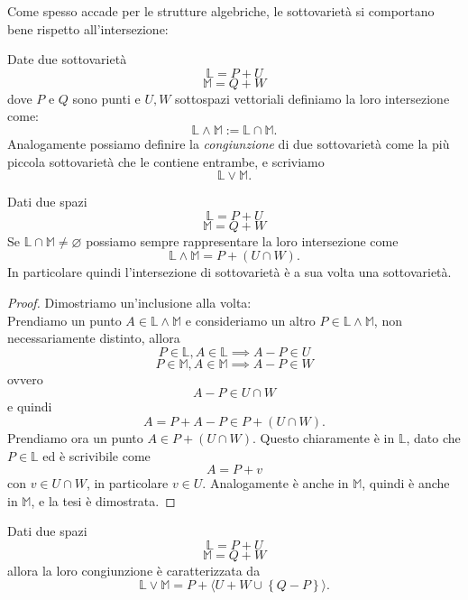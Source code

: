 \documentclass[11pt]{scrartcl}
\newcommand{\eset}{\varnothing}
\begin{document}
   	 Come spesso accade per le strutture algebriche, le sottovarietà si comportano bene rispetto all'intersezione:
   	 \begin{definition}
   	 	Date due sottovarietà 
   	 	$$\mathbb{L}=P+U$$
   	 	$$\mathbb{M}=Q+W$$
   	 	dove $P$ e $Q$ sono punti e $U,W$ sottospazi vettoriali definiamo la loro intersezione come:
   	 	$$\mathbb{L}\land \mathbb{M}:=\mathbb{L}\cap \mathbb{M}.$$
   	 	Analogamente possiamo definire la \textit{congiunzione} di due sottovarietà come la più piccola sottovarietà che le contiene entrambe, e scriviamo
   	 	$$\mathbb{L}\lor \mathbb{M}.$$
   	 \end{definition}
   	 \begin{proposition}
   	 	Dati due spazi
   	 	$$\mathbb{L}=P+U$$
   	 	$$\mathbb{M}=Q+W$$
   	 	Se $\mathbb{L}\cap \mathbb{M}\ne \eset$ possiamo sempre rappresentare la loro intersezione come
   	 	$$\mathbb{L}\land \mathbb{M}=P+(U\cap W).$$
   	 	In particolare quindi l'intersezione di sottovarietà è a sua volta una sottovarietà.
   	 \end{proposition}
   	 \begin{proof}
   	 	Dimostriamo un'inclusione alla volta: \\
   	 	Prendiamo un punto $A\in \mathbb{L}\land \mathbb{M}$ e consideriamo un altro $P\in \mathbb{L}\land \mathbb{M}$, non necessariamente distinto, allora
   	 	$$P\in \mathbb{L}, A\in \mathbb{L} \implies A-P \in U$$
   	 	$$P\in \mathbb{M}, A\in \mathbb{M} \implies A-P \in W$$
   	 	ovvero 
   	 	$$A-P\in U\cap W$$
   	 	e quindi
   	 	$$A=P+A-P\in P+(U\cap W).$$
   	 	Prendiamo ora un punto $A\in P+(U\cap W)$. Questo chiaramente è in $\mathbb{L}$, dato che $P\in \mathbb{L}$ ed è scrivibile come
   	 	$$A=P+v$$
   	 	con $v\in U\cap W$, in particolare $v\in U$. Analogamente è anche in $\mathbb{M}$, quindi è anche in $\mathbb{M}$, e la tesi è dimostrata.
   	 \end{proof}
   	 \begin{proposition}
   	 	Dati due spazi
   	 	$$\mathbb{L}=P+U$$
   	 	$$\mathbb{M}=Q+W$$
   	 	allora la loro congiunzione è caratterizzata da
   	 	$$\mathbb{L}\lor \mathbb{M}=P+\langle U+ W\cup \left\{Q-P\right\}\rangle.$$
   	 \end{proposition}
\end{document}
